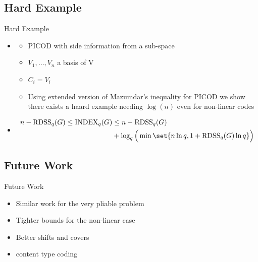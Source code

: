 \documentclass[xcolor=dvipsnames, aspectratio=169]{beamer}
\newcommand{\rdss}{\mathrm{RDSS}}
\newcommand{\indx}{\mathrm{INDEX}}
\begin{document}
\subsection{Hard Example}
\begin{frame}{Hard Example}
	\begin{itemize}
		\item<1->[]
			\begin{example}
				\begin{itemize}
					\item<1->[] PICOD with side information from a sub-space
					\item<2->[] $V_1, \ldots, V_n$ a basis of V
					\item<3->[] $C_i = V_i$
					\item<4->[] Using extended version of Mazumdar's inequality for PICOD we show there exists a haard example needing $\log(n)$ even for non-linear codes
				\end{itemize}
			\end{example}
		\item <5->[]
			\begin{theorem}[Mazumdar]
				\begin{align*}
					n - \rdss_q(G) \le \indx_q(G) &\le n -\rdss_q(G) \\
					&+ \log_q\Big(\min\set{n\ln q, 1+ \rdss_q(G)\ln q }\Big)
				\end{align*}
			\end{theorem}
	\end{itemize}
\end{frame}
\subsection{Future Work}
\begin{frame}{Future Work}
	\begin{itemize}
		\item<1-> Similar work for the very pliable problem
		\item<2-> Tighter bounds for the non-linear case
		\item<3-> Better shifts and covers
		\item<4-> content type coding
		
	\end{itemize}
\end{frame}

\end{document}

